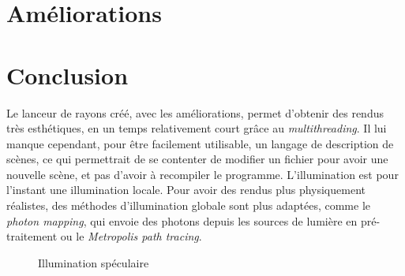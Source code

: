 \documentclass[10pt,a4paper]{article}
\begin{document}
\section{Améliorations} %



\section*{Conclusion}
  Le lanceur de rayons créé, avec les améliorations, permet d'obtenir des rendus très esthétiques, en un temps relativement court 
  grâce au \emph{multithreading}. Il lui manque cependant, pour être facilement utilisable, un langage de description de scènes, ce qui permettrait
  de se contenter de modifier un fichier pour avoir une nouvelle scène, et pas d'avoir à recompiler le programme.
    L'illumination est pour l'instant une illumination locale. Pour avoir des rendus plus physiquement réalistes, des méthodes d'illumination globale
  sont plus adaptées, comme le \emph{photon mapping}, qui envoie des photons depuis les sources de lumière en pré-traitement ou le \emph{Metropolis path tracing}.


\tableofcontents

\appendix %

\begin{figure}[b]
\caption{Illumination spéculaire} \label{speculaire}
\end{figure}
\end{document}
